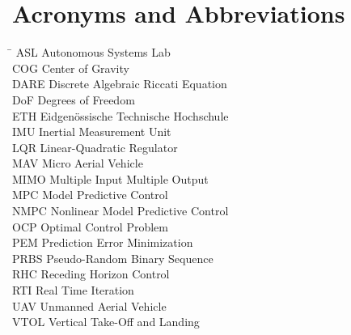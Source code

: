 \section*{Acronyms and Abbreviations}
\begin{tabbing}
 \hspace*{1.6cm}  \= \kill
 ASL \> Autonomous Systems Lab \\[0.5ex]
 COG \> Center of Gravity \\[0.5ex]
 DARE \> Discrete Algebraic Riccati Equation \\[0.5ex]
 DoF \> Degrees of Freedom \\[0.5ex]
 ETH \> Eidgenössische Technische Hochschule \\[0.5ex]
 IMU \> Inertial Measurement Unit \\[0.5ex]
 LQR \> Linear-Quadratic Regulator \\[0.5ex]
 MAV \> Micro Aerial Vehicle \\[0.5ex]
 MIMO \> Multiple Input Multiple Output \\[0.5ex]
 MPC \> Model Predictive Control \\[0.5ex]
 NMPC \> Nonlinear Model Predictive Control \\[0.5ex]
 OCP \> Optimal Control Problem \\[0.5ex]
 PEM \> Prediction Error Minimization \\[0.5ex]
 PRBS \> Pseudo-Random Binary Sequence \\[0.5ex]
 RHC \> Receding Horizon Control \\[0.5ex]
 RTI \> Real Time Iteration \\[0.5ex]
 UAV \> Unmanned Aerial Vehicle \\[0.5ex]
 VTOL \> Vertical Take-Off and Landing \\[0.5ex]

\end{tabbing}
